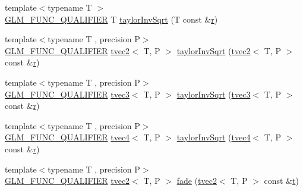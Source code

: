 \begin{DoxyCompactItemize}
\item 
{\footnotesize template$<$typename T $>$ }\\\mbox{\hyperlink{setup_8hpp_a33fdea6f91c5f834105f7415e2a64407}{G\+L\+M\+\_\+\+F\+U\+N\+C\+\_\+\+Q\+U\+A\+L\+I\+F\+I\+ER}} T \mbox{\hyperlink{namespaceglm_1_1detail_a82e6fa9d633a5f76f8b7e046ac5d91f4}{taylor\+Inv\+Sqrt}} (T const \&\mbox{\hyperlink{glad_8h_abe08814c2f72843fde4d8df41440d5a0}{r}})
\item 
{\footnotesize template$<$typename T , precision P$>$ }\\\mbox{\hyperlink{setup_8hpp_a33fdea6f91c5f834105f7415e2a64407}{G\+L\+M\+\_\+\+F\+U\+N\+C\+\_\+\+Q\+U\+A\+L\+I\+F\+I\+ER}} \mbox{\hyperlink{structglm_1_1tvec2}{tvec2}}$<$ T, P $>$ \mbox{\hyperlink{namespaceglm_1_1detail_a2701f5a9f9fa29fe03d394745337aacb}{taylor\+Inv\+Sqrt}} (\mbox{\hyperlink{structglm_1_1tvec2}{tvec2}}$<$ T, P $>$ const \&\mbox{\hyperlink{glad_8h_abe08814c2f72843fde4d8df41440d5a0}{r}})
\item 
{\footnotesize template$<$typename T , precision P$>$ }\\\mbox{\hyperlink{setup_8hpp_a33fdea6f91c5f834105f7415e2a64407}{G\+L\+M\+\_\+\+F\+U\+N\+C\+\_\+\+Q\+U\+A\+L\+I\+F\+I\+ER}} \mbox{\hyperlink{structglm_1_1tvec3}{tvec3}}$<$ T, P $>$ \mbox{\hyperlink{namespaceglm_1_1detail_a1caf0cdde7601f279fcc51436474b9f6}{taylor\+Inv\+Sqrt}} (\mbox{\hyperlink{structglm_1_1tvec3}{tvec3}}$<$ T, P $>$ const \&\mbox{\hyperlink{glad_8h_abe08814c2f72843fde4d8df41440d5a0}{r}})
\item 
{\footnotesize template$<$typename T , precision P$>$ }\\\mbox{\hyperlink{setup_8hpp_a33fdea6f91c5f834105f7415e2a64407}{G\+L\+M\+\_\+\+F\+U\+N\+C\+\_\+\+Q\+U\+A\+L\+I\+F\+I\+ER}} \mbox{\hyperlink{structglm_1_1tvec4}{tvec4}}$<$ T, P $>$ \mbox{\hyperlink{namespaceglm_1_1detail_aeed0650a4d83ef1ac366990c0350a583}{taylor\+Inv\+Sqrt}} (\mbox{\hyperlink{structglm_1_1tvec4}{tvec4}}$<$ T, P $>$ const \&\mbox{\hyperlink{glad_8h_abe08814c2f72843fde4d8df41440d5a0}{r}})
\item 
{\footnotesize template$<$typename T , precision P$>$ }\\\mbox{\hyperlink{setup_8hpp_a33fdea6f91c5f834105f7415e2a64407}{G\+L\+M\+\_\+\+F\+U\+N\+C\+\_\+\+Q\+U\+A\+L\+I\+F\+I\+ER}} \mbox{\hyperlink{structglm_1_1tvec2}{tvec2}}$<$ T, P $>$ \mbox{\hyperlink{namespaceglm_1_1detail_ab0a5374736735becd50c327f859ed62e}{fade}} (\mbox{\hyperlink{structglm_1_1tvec2}{tvec2}}$<$ T, P $>$ const \&\mbox{\hyperlink{glad_8h_aef9f00bf06d58b8db7e501e287488401}{t}})

\end{DoxyCompactItemize}
